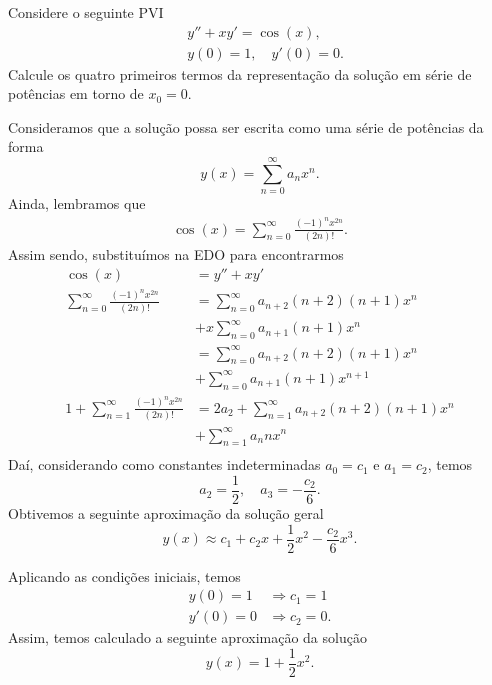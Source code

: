 \begin{exeresol}
  Considere o seguinte PVI
  \begin{align}
    & y'' + xy' = \cos(x),\\
    & y(0)=1,\quad y'(0)=0.
  \end{align}
  Calcule os quatro primeiros termos da representação da solução em série de potências em torno de $x_0=0$.
\end{exeresol}
\begin{resol}
  Consideramos que a solução possa ser escrita como uma série de potências da forma
  \begin{equation}
    y(x) = \sum_{n=0}^\infty a_nx^n.
  \end{equation}
  Ainda, lembramos que
  \begin{align}
    \cos(x) = \sum_{n=0}^\infty \frac{(-1)^nx^{2n}}{(2n)!}.
  \end{align}
  Assim sendo, substituímos na EDO para encontrarmos
  \begin{align}
    \cos(x) &= y'' + xy' \\
    \sum_{n=0}^\infty \frac{(-1)^nx^{2n}}{(2n)!} &= \sum_{n=0}^\infty a_{n+2}(n+2)(n+1)x^n \\
            &+ x\sum_{n=0}^\infty a_{n+1}(n+1)x^n \\
            &= \sum_{n=0}^\infty a_{n+2}(n+2)(n+1)x^n \\
            &+ \sum_{n=0}^\infty a_{n+1}(n+1)x^{n+1} \\
    1 + \sum_{n=1}^\infty \frac{(-1)^nx^{2n}}{(2n)!} &= 2a_2 + \sum_{n=1}^\infty a_{n+2}(n+2)(n+1)x^n \\
            &+ \sum_{n=1}^\infty a_nnx^n \\
  \end{align}
  Daí, considerando como constantes indeterminadas $a_0=c_1$ e $a_1=c_2$, temos
  \begin{equation}
    a_2 = \frac{1}{2},\quad a_3 = -\frac{c_2}{6}. 
  \end{equation}
  Obtivemos a seguinte aproximação da solução geral
  \begin{equation}
    y(x) \approx c_1 + c_2x + \frac{1}{2}x^2 - \frac{c_2}{6}x^3.
  \end{equation}

  Aplicando as condições iniciais, temos
  \begin{align}
    y(0) = 1 &\Rightarrow c_1 = 1\\
    y'(0) = 0 &\Rightarrow c_2 = 0.
  \end{align}
  Assim, temos calculado a seguinte aproximação da solução
  \begin{equation}
    y(x) = 1 + \frac{1}{2}x^2.
  \end{equation}
\end{resol}

